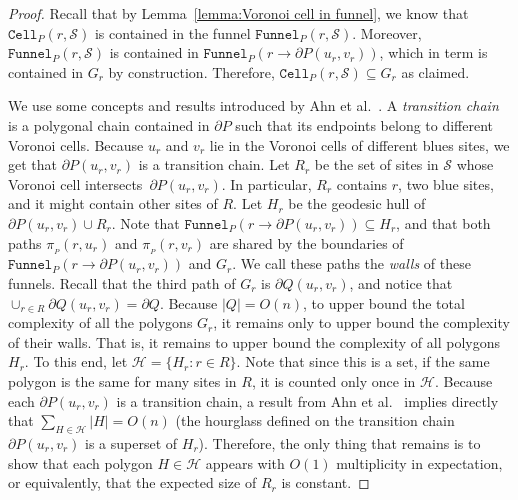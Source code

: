\documentclass[a4paper, 11pt]{article}
\newcommand{\s}{\mathcal S}
\newcommand{\p}[3][P]{\ensuremath{\pi_{_{#1}}(#2, #3)}}
\newcommand{\funnel}[2][P]{\ensuremath{\mathtt{Funnel}_{\scriptscriptstyle #1}(#2)}}
\newcommand{\cell}[2][P]{\ensuremath{\mathtt{Cell}_{\scriptscriptstyle #1}(#2)}}
\newcommand{\bcell}[2][P]{\ensuremath{\mathtt{bCell}_{\scriptscriptstyle #1}(#2)}}
\begin{document}
\begin{proof}
Recall that by Lemma~\ref{lemma:Voronoi cell in funnel}, we know that $\cell{r, \s}$ is contained in the funnel $\funnel{r, \s}$.
Moreover, $\funnel{r, \s}$ is contained in $\funnel{r\to  \partial P(u_r, v_r)}$, which in term is contained in $G_r$ by construction.
Therefore, $\cell{r, \s}\subseteq G_r$ as claimed. 



We use some concepts and results introduced by Ahn et al.~\cite[Section 3]{ahn2015linear}.
A \emph{transition chain} is a polygonal chain contained in $\partial P$ such that its endpoints belong to different Voronoi cells. 
Because  $u_r$ and $v_r$ lie in the Voronoi cells of different blues sites, 
we get that $\partial P(u_r, v_r)$ is a transition chain. 
Let $R_r$ be the set of sites in $\s$ whose Voronoi cell intersects~$\partial P(u_r, v_r)$. 
In particular, $R_r$ contains $r$, two blue sites, and it might contain other sites of $R$.
Let $H_r$ be the geodesic hull of $\partial P(u_r, v_r) \cup R_r$. 
Note that $\funnel{r\to \partial P(u_r, v_r)} \subseteq H_r$, and that both paths $\p{r}{u_r}$ and $\p{r}{v_r}$ are shared by the boundaries of $\funnel{r\to \partial P(u_r, v_r)}$ and $G_r$.
We call these paths the \emph{walls} of these funnels. 
Recall that the third path of $G_r$ is $\partial Q(u_r, v_r)$, and notice that $\cup_{r\in R} \partial Q(u_r, v_r) = \partial Q$. 
Because $|Q| = O(n)$, to upper bound the total complexity of all the polygons $G_r$, 
it remains only to upper bound the complexity of their walls. 
That is, it remains to upper bound the complexity of all polygons $H_r$. 
To this end, let $\mathcal H = \{H_r : r\in R\}$. Note that since this is a set, if the same polygon is the same for many sites in $R$, it is counted only once in $\mathcal H$.
Because each $\partial P(u_r, v_r)$ is a transition chain, a result from Ahn et al.~\cite[Lemma 3.6]{ahn2015linear} implies directly that $\sum_{H\in \mathcal H} |H| = O(n)$ (the hourglass defined on the transition chain $\partial P(u_r, v_r)$ is a superset of $H_r$). 
Therefore, the only thing that remains is to show that each polygon $H\in \mathcal H$ appears with $O(1)$ multiplicity in expectation, or equivalently, that the expected size of $R_r$ is constant. 



\end{proof}
\end{document}
